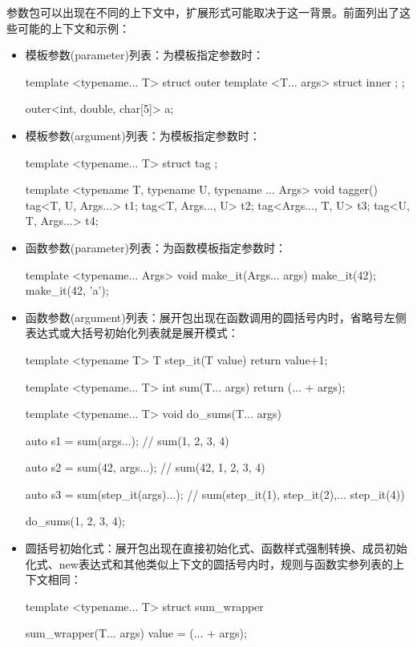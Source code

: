 参数包可以出现在不同的上下文中，扩展形式可能取决于这一背景。前面列出了这些可能的上下文和示例：

\begin{itemize}
  \item 模板参数(parameter)列表：为模板指定参数时：

\begin{cppcode}
template <typename... T>
struct outer
{
	template <T... args>
	struct inner {};
};

outer<int, double, char[5]> a;
\end{cppcode}
  \item 模板参数(argument)列表：为模板指定参数时：

\begin{cppcode}
template <typename... T>
struct tag {};

template <typename T, typename U, typename ... Args>
void tagger()
{
	tag<T, U, Args...> t1;
	tag<T, Args..., U> t2;
	tag<Args..., T, U> t3;
	tag<U, T, Args...> t4;
}
\end{cppcode}
  \item 函数参数(parameter)列表：为函数模板指定参数时：

\begin{cppcode}
template <typename... Args>
void make_it(Args... args)
{ }
make_it(42);
make_it(42, 'a');
\end{cppcode}
  \item 函数参数(argument)列表：展开包出现在函数调用的圆括号内时，省略号左侧表达式或大括号初始化列表就是展开模式：

\begin{cppcode}
template <typename T>
T step_it(T value)
{
	return value+1;
}

template <typename... T>
int sum(T... args)
{
	return (... + args);
}

template <typename... T>
void do_sums(T... args)
{
	auto s1 = sum(args...);
	// sum(1, 2, 3, 4)
	
	auto s2 = sum(42, args...);
	// sum(42, 1, 2, 3, 4)
	
	auto s3 = sum(step_it(args)...);
	// sum(step_it(1), step_it(2),... step_it(4))
}

do_sums(1, 2, 3, 4);
\end{cppcode}
  \item 圆括号初始化式：展开包出现在直接初始化式、函数样式强制转换、成员初始化式、new表达式和其他类似上下文的圆括号内时，规则与函数实参列表的上下文相同：

\begin{cppcode}
template <typename... T>
struct sum_wrapper
{
	sum_wrapper(T... args)
	{
		value = (... + args);
	}

}
\end{cppcode}
\end{itemize}

